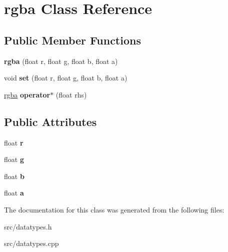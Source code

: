 \hypertarget{classrgba}{
\section{rgba Class Reference}
\label{classrgba}
}
\subsection*{Public Member Functions}
\begin{DoxyCompactItemize}
\item 
\hypertarget{classrgba_ad8f97a0459a5fb9319e50f5383e549a9}{
{\bfseries rgba} (float r, float g, float b, float a)}
\label{classrgba_ad8f97a0459a5fb9319e50f5383e549a9}

\item 
\hypertarget{classrgba_ac7d00265b569fb400f19acfb1646ccf1}{
void {\bfseries set} (float r, float g, float b, float a)}
\label{classrgba_ac7d00265b569fb400f19acfb1646ccf1}

\item 
\hypertarget{classrgba_ab111ee1a6f405f4ec36ec8d45e723f59}{
\hyperlink{classrgba}{rgba} {\bfseries operator$\ast$} (float rhs)}
\label{classrgba_ab111ee1a6f405f4ec36ec8d45e723f59}

\end{DoxyCompactItemize}
\subsection*{Public Attributes}
\begin{DoxyCompactItemize}
\item 
\hypertarget{classrgba_ad28c541779ff52661c1c2bb14704ff47}{
float {\bfseries r}}
\label{classrgba_ad28c541779ff52661c1c2bb14704ff47}

\item 
\hypertarget{classrgba_ab637d45df1ed85f84f88aaa14f4086f5}{
float {\bfseries g}}
\label{classrgba_ab637d45df1ed85f84f88aaa14f4086f5}

\item 
\hypertarget{classrgba_a5ff69cb7345eef664a5fb6e59dab7081}{
float {\bfseries b}}
\label{classrgba_a5ff69cb7345eef664a5fb6e59dab7081}

\item 
\hypertarget{classrgba_af0dce592180f0b97a0d45ec8a06fd407}{
float {\bfseries a}}
\label{classrgba_af0dce592180f0b97a0d45ec8a06fd407}

\end{DoxyCompactItemize}


The documentation for this class was generated from the following files:\begin{DoxyCompactItemize}
\item 
src/datatypes.h\item 
src/datatypes.cpp\end{DoxyCompactItemize}

